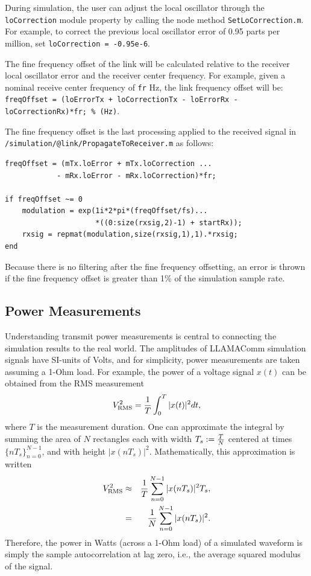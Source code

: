 During simulation, the user can adjust the local oscillator through the \verb+loCorrection+ module property by calling the node method \verb+SetLoCorrection.m+.  For example, to correct the previous local oscillator error of 0.95 parts per million, set \verb+loCorrection = -0.95e-6+.

The fine frequency offset of the link will be calculated relative to the receiver local oscillator error and the receiver center frequency.  For example, given a nominal receive center frequency of \verb+fr+ Hz, the link frequency offset will be: \verb|freqOffset = (loErrorTx + loCorrectionTx - loErrorRx - loCorrectionRx)*fr; % (Hz)|.

The fine frequency offset is the last processing applied to the received signal in \verb+/simulation/@link/PropagateToReceiver.m+ as follows:
\begin{verbatim}
freqOffset = (mTx.loError + mTx.loCorrection ...
            - mRx.loError - mRx.loCorrection)*fr;
            
if freqOffset ~= 0
    modulation = exp(1i*2*pi*(freqOffset/fs)...
                     *((0:size(rxsig,2)-1) + startRx));
    rxsig = repmat(modulation,size(rxsig,1),1).*rxsig;
end
\end{verbatim}

Because there is no filtering after the fine frequency offsetting, an error is thrown if the fine frequency offset is greater than 1\% of the simulation sample rate.

\subsection{Power Measurements} \label{sec:powermeasurements}
Understanding transmit power measurements is
central to connecting the simulation results to the real world. The amplitudes of LLAMAComm
simulation signals have SI-units of Volts, and for simplicity, power
measurements are taken assuming a 1-Ohm load.  For example, the power of a
voltage signal $x(t)$ can be obtained from the RMS measurement
%
\begin{eqnarray}
    V_{\rm RMS}^2 = \frac{1}{T}\int_0^T |x(t)|^2 dt,
\end{eqnarray}
%
where $T$ is the measurement duration.  One can approximate the integral by
summing the area of $N$ rectangles each with width $T_s := \frac{T}{N}$
centered at times  $\{nT_s\}_{n=0}^{N-1}$, and with height $|x(nT_s)|^2$.
Mathematically, this approximation is written
%
\begin{eqnarray}
    V_{\rm RMS}^2 &\approx& \frac{1}{T}\sum_{n = 0}^{N-1}
        |x(nT_s)|^2T_s,\\
        &=&\frac{1}{N}\sum_{n = 0}^{N-1}|x(nT_s)|^2.
\end{eqnarray}
%
Therefore, the power in Watts (across a 1-Ohm load) of a simulated waveform is
simply the sample autocorrelation at lag zero, i.e., the average squared
modulus of the signal.

